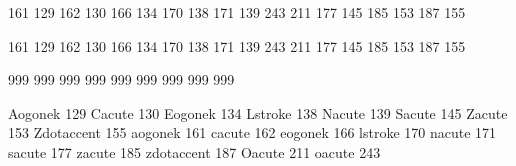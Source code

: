 

\startmapping[pl0]

 161 129 %
 162 130 %
 166 134 %
 170 138 %
 171 139 %
 243 211 %
 177 145 %
 185 153 %
 187 155 %

 161 129  %
 162 130  %
 166 134  %
 170 138  %
 171 139  %
 243 211  %
 177 145  %
 185 153  %
 187 155  %

\stopmapping

\startmapping[pl0]

 999  %
 999  %
 999  %
 999  %
 999  %
 999  %
 999  %
 999  %
 999  %

\stopmapping

\startencoding[pl0]

 Aogonek    129
 Cacute     130
 Eogonek    134
 Lstroke    138
 Nacute     139
 Sacute     145
 Zacute     153
 Zdotaccent 155
 aogonek    161
 cacute     162
 eogonek    166
 lstroke    170
 nacute     171
 sacute     177
 zacute     185
 zdotaccent 187
 Oacute     211
 oacute     243

